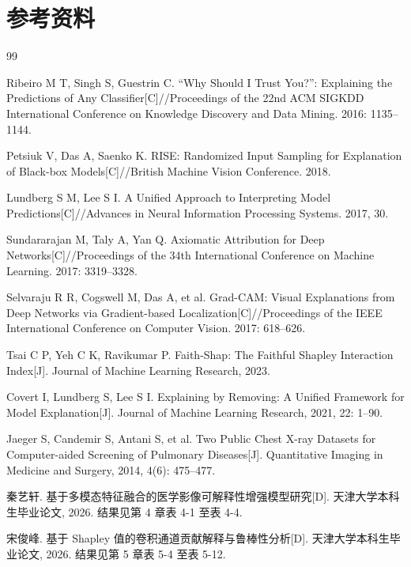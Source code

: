 
\clearpage
{}
\chapter*{参考资料}

\begin{thebibliography}{99}

Ribeiro M T, Singh S, Guestrin C. ``Why Should I Trust You?'': Explaining the Predictions of Any Classifier[C]//Proceedings of the 22nd ACM SIGKDD International Conference on Knowledge Discovery and Data Mining. 2016: 1135--1144.

Petsiuk V, Das A, Saenko K. RISE: Randomized Input Sampling for Explanation of Black-box Models[C]//British Machine Vision Conference. 2018.

Lundberg S M, Lee S I. A Unified Approach to Interpreting Model Predictions[C]//Advances in Neural Information Processing Systems. 2017, 30.

Sundararajan M, Taly A, Yan Q. Axiomatic Attribution for Deep Networks[C]//Proceedings of the 34th International Conference on Machine Learning. 2017: 3319--3328.

Selvaraju R R, Cogswell M, Das A, et al. Grad-CAM: Visual Explanations from Deep Networks via Gradient-based Localization[C]//Proceedings of the IEEE International Conference on Computer Vision. 2017: 618--626.

Tsai C P, Yeh C K, Ravikumar P. Faith-Shap: The Faithful Shapley Interaction Index[J]. Journal of Machine Learning Research, 2023.

Covert I, Lundberg S, Lee S I. Explaining by Removing: A Unified Framework for Model Explanation[J]. Journal of Machine Learning Research, 2021, 22: 1--90.

Jaeger S, Candemir S, Antani S, et al. Two Public Chest X-ray Datasets for Computer-aided Screening of Pulmonary Diseases[J]. Quantitative Imaging in Medicine and Surgery, 2014, 4(6): 475--477.

秦艺轩. 基于多模态特征融合的医学影像可解释性增强模型研究[D]. 天津大学本科生毕业论文, 2026. 结果见第 4 章表 4-1 至表 4-4.

宋俊峰. 基于 Shapley 值的卷积通道贡献解释与鲁棒性分析[D]. 天津大学本科生毕业论文, 2026. 结果见第 5 章表 5-4 至表 5-12.


\end{thebibliography}
